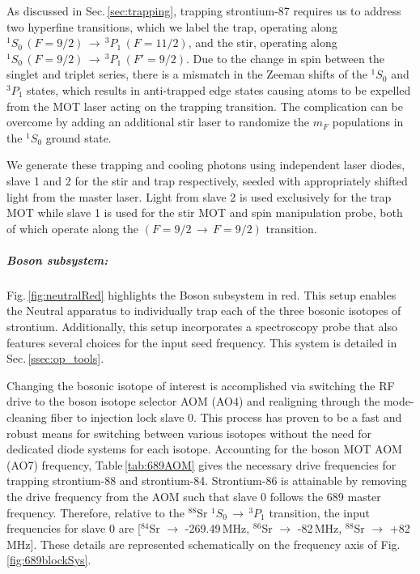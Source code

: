 As discussed in Sec.\,\ref{sec:trapping}, trapping strontium-87 requires us to address two hyperfine transitions, which we label the trap, operating along $^1S_0\,(F=9/2)\,\rightarrow\,^3P_1\,(F=11/2)$, and the stir, operating along $^1S_0\,(F=9/2)\,\rightarrow\,^3P_1\,(F'=9/2)$.
Due to the change in spin between the singlet and triplet series, there is a mismatch in the Zeeman shifts of the $^1S_0$ and $^3P_1$ states, which results in anti-trapped edge states causing atoms to be expelled from the MOT laser acting on the trapping transition.
The complication can be overcome by adding an additional stir laser to randomize the $m_F$ populations in the $^1S_0$ ground state.

We generate these trapping and cooling photons using independent laser diodes, slave 1 and 2 for the stir and trap respectively, seeded with appropriately shifted light from the master laser.
Light from slave 2 is used exclusively for the trap MOT while slave 1 is used for the stir MOT and spin manipulation probe, both of which operate along the $(F=9/2\,\rightarrow\,F=9/2)$ transition.

\subparagraph{Boson subsystem:}
Fig.\,\ref{fig:neutralRed} highlights the Boson subsystem in red.
This setup enables the Neutral apparatus to individually trap each of the three bosonic isotopes of strontium.
Additionally, this setup incorporates a spectroscopy probe that also features several choices for the input seed frequency. 
This system is detailed in Sec.\,\ref{ssec:op_tools}.

Changing the bosonic isotope of interest is accomplished via switching the RF drive to the boson isotope selector AOM (AO4) and realigning through the mode-cleaning fiber to injection lock slave 0.
This process has proven to be a fast and robust means for switching between various isotopes without the need for dedicated diode systems for each isotope.
Accounting for the boson MOT AOM (AO7) frequency, Table\,\ref{tab:689AOM} gives the necessary drive frequencies for trapping strontium-88 and strontium-84.
Strontium-86 is attainable by removing the drive frequency from the AOM such that slave 0 follows the 689 master frequency.
Therefore, relative to the $^{88}$Sr $^1S_0\,\rightarrow\,^3P_1$ transition, the input frequencies for slave 0 are [$^{84}$Sr $\rightarrow$ -269.49\,MHz, $^{86}$Sr $\rightarrow$ -82\,MHz, $^{88}$Sr $\rightarrow$ +82\,MHz].
These details are represented schematically on the frequency axis of Fig.\,\ref{fig:689blockSys}.
	
